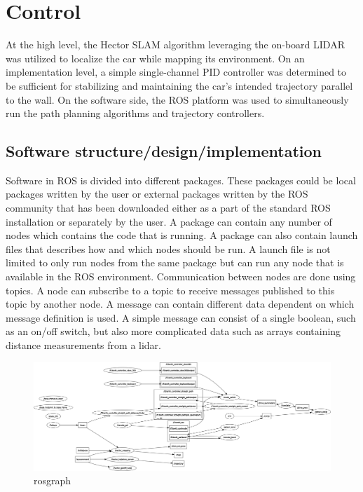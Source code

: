 \documentclass{LTHtwocol} %
\begin{document}
\section{Control}
At the high level, the Hector SLAM algorithm leveraging the on-board LIDAR was utilized to localize the car while mapping its environment. On an implementation level, a simple single-channel PID controller was determined to be sufficient for stabilizing and maintaining the car's intended trajectory parallel to the wall. On the software side, the ROS platform was used to simultaneously run the path planning algorithms and trajectory controllers.

\subsection{Software structure/design/implementation}
Software in ROS is divided into different packages. These packages could be local packages written by the user or external packages written by the ROS community that has been downloaded either as a part of the standard ROS installation or separately by the user. A package can contain any number of nodes which contains the code that is running. A package can also contain launch files that describes how and which nodes should be run. A launch file is not limited to only run nodes from the same package but can run any node that is available in the ROS environment. Communication between nodes are done using topics. A node can subscribe to a topic to receive messages published to this topic by another node. A message can contain different data dependent on which message definition is used. A simple message can consist of a single boolean, such as an on/off switch, but also more complicated data such as arrays containing distance measurements from a lidar.

\begin{figure}
	\centering
	\includegraphics[width=0.7\columnwidth]{images/rosgraph}
	\caption{rosgraph}
	\label{fig:rosgraph}
\end{figure}
\end{document}
